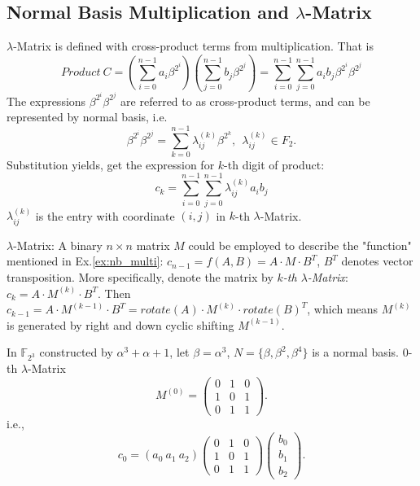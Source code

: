 \appendix
\subsection{Normal Basis Multiplication and $\lambda$-Matrix}
$\lambda$-Matrix is defined with cross-product terms from multiplication. That is 
\begin{displaymath}
Product\ C = (\sum_{i=0}^{n-1}a_i\beta^{2^i})(\sum_{j=0}^{n-1}b_j\beta^{2^j}) = \sum_{i=0}^{n-1}\sum_{j=0}^{n-1}a_ib_j\beta^{2^i}\beta^{2^j}
\end{displaymath}
The expressions $\beta^{2^i}\beta^{2^j}$ are referred to as cross-product terms, and can be represented by
normal basis, i.e.
\begin{displaymath}
\beta^{2^i}\beta^{2^j} = \sum_{k=0}^{n-1}\lambda_{ij}^{(k)}\beta^{2^k}, \ \ \lambda_{ij}^{(k)} \in F_2.
\end{displaymath}
Substitution yields, get the expression for $k$-th digit of product:
\begin{displaymath}
c_k = \sum_{i=0}^{n-1}\sum_{j=0}^{n-1}\lambda_{ij}^{(k)}a_ib_j
\end{displaymath}
$\lambda_{ij}^{(k)}$ is the entry with coordinate $(i,j)$ in $k$-th $\lambda$-Matrix.

\begin{Example}
$\lambda$-Matrix: A binary $n\times n$ matrix $M$ could be employed to describe the "function"
 mentioned in Ex.\ref{ex:nb_multi}: $c_{n-1} = f(A, B) = A \cdot M \cdot B^T$, $B^T$ denotes vector transposition. 
More specifically, denote the matrix by \emph{$k$-th $\lambda$-Matrix}: $c_k = A \cdot M^{(k)} \cdot B^T$.
Then $c_{k-1} = A \cdot M^{(k-1)} \cdot B^T = rotate(A) \cdot M^{(k)} \cdot rotate(B)^T$, which means $M^{(k)}$ is generated
by right and down cyclic shifting $M^{(k-1)}$.

In $\mathbb{F}_{2^3}$ constructed by $\alpha^3 + \alpha + 1$, let $\beta = \alpha^3$, $N = \{ \beta, \beta^2, \beta^4\}$ 
is a normal basis. $0$-th $\lambda$-Matrix
\begin{displaymath}
M^{(0)} = \left(
\begin{array} {lcr}
0 & 1 & 0\\
1 & 0 & 1\\
0 & 1 & 1
\end{array} \right).
\end{displaymath}
i.e.,
\begin{displaymath}
c_0 = (a_0\  a_1\  a_2)\left(
\begin{array} {lcr}
0 & 1 & 0\\
1 & 0 & 1\\
0 & 1 & 1
\end{array} \right)\left(
\begin{array} {lcr}
b_0\\
b_1\\
b_2
\end{array} \right).
\end{displaymath}
\end{Example}
